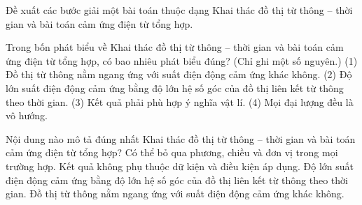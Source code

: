 \begin{bt}
Đề xuất các bước giải một bài toán thuộc dạng Khai thác đồ thị từ thông – thời gian và bài toán cảm ứng điện từ tổng hợp.
\end{bt}

\begin{ex}
Trong bốn phát biểu về Khai thác đồ thị từ thông – thời gian và bài toán cảm ứng điện từ tổng hợp, có bao nhiêu phát biểu đúng? (Chỉ ghi một số nguyên.) (1) Đồ thị từ thông nằm ngang ứng với suất điện động cảm ứng khác không. (2) Độ lớn suất điện động cảm ứng bằng độ lớn hệ số góc của đồ thị liên kết từ thông theo thời gian. (3) Kết quả phải phù hợp ý nghĩa vật lí. (4) Mọi đại lượng đều là vô hướng.
\end{ex}

\begin{ex}
Nội dung nào mô tả đúng nhất Khai thác đồ thị từ thông – thời gian và bài toán cảm ứng điện từ tổng hợp?
\choice
{Có thể bỏ qua phương, chiều và đơn vị trong mọi trường hợp.}
{Kết quả không phụ thuộc dữ kiện và điều kiện áp dụng.}
{\True Độ lớn suất điện động cảm ứng bằng độ lớn hệ số góc của đồ thị liên kết từ thông theo thời gian.}
{Đồ thị từ thông nằm ngang ứng với suất điện động cảm ứng khác không.}
\end{ex}

